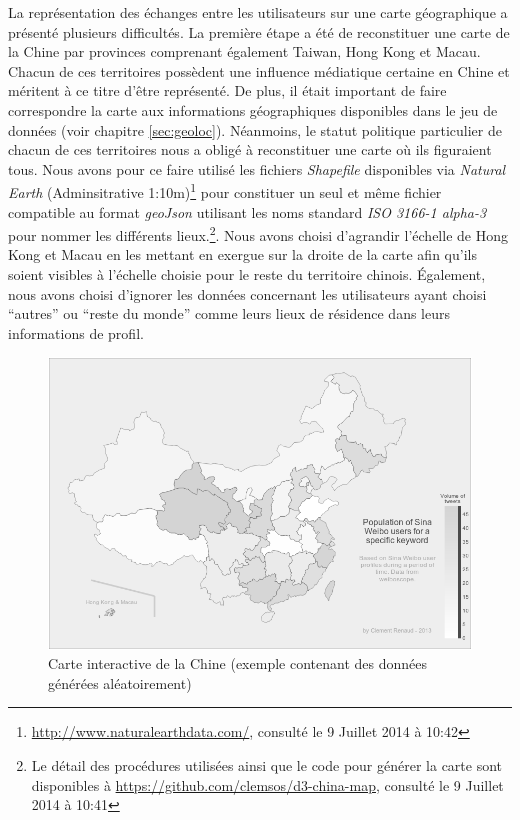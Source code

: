     La représentation des échanges entre les utilisateurs sur une carte géographique a présenté plusieurs difficultés. La première étape a été de reconstituer une carte de la Chine par provinces comprenant également Taiwan, Hong Kong et Macau. Chacun de ces territoires possèdent une influence médiatique certaine en Chine et méritent à ce titre d{\textquoteright}être représenté. De plus, il était important de faire correspondre la carte aux informations géographiques disponibles dans le jeu de données (voir chapitre \ref{sec:geoloc}). Néanmoins, le statut politique particulier de chacun de ces territoires nous a obligé à reconstituer une carte o\`u ils figuraient tous. Nous avons pour ce faire utilisé les fichiers \textit{Shapefile} disponibles via \textit{Natural Earth} (Adminsitrative 1:10m)\footnote{\url{http://www.naturalearthdata.com/}, consulté le 9 Juillet 2014 à 10:42} pour constituer un seul et même fichier compatible au format \textit{geoJson} utilisant les noms standard \textit{ISO 3166-1 alpha-3} pour nommer les différents lieux.\footnote{Le détail des procédures utilisées ainsi que le code pour générer la carte sont disponibles à \url{https://github.com/clemsos/d3-china-map}, consulté le 9 Juillet 2014 à 10:41}. Nous avons choisi d{\textquoteright}agrandir l{\textquoteright}échelle de Hong Kong et Macau en les mettant en exergue sur la droite de la carte afin qu{\textquoteright}ils soient visibles à l'échelle choisie pour le reste du territoire chinois. \'Egalement, nous avons choisi d'ignorer les données concernant les utilisateurs ayant choisi {\textquotedblleft}autres{\textquotedblright} ou {\textquotedblleft}reste du monde{\textquotedblright} comme leurs lieux de résidence dans leurs informations de profil.


    \begin{figure}
        \centering
        \includegraphics[scale=0.4]{figures/chap4/ui/ui-map.png}
        \caption{Carte interactive de la Chine (exemple contenant des données générées aléatoirement)}
        \label{fig:ui-map}
    \end{figure}

